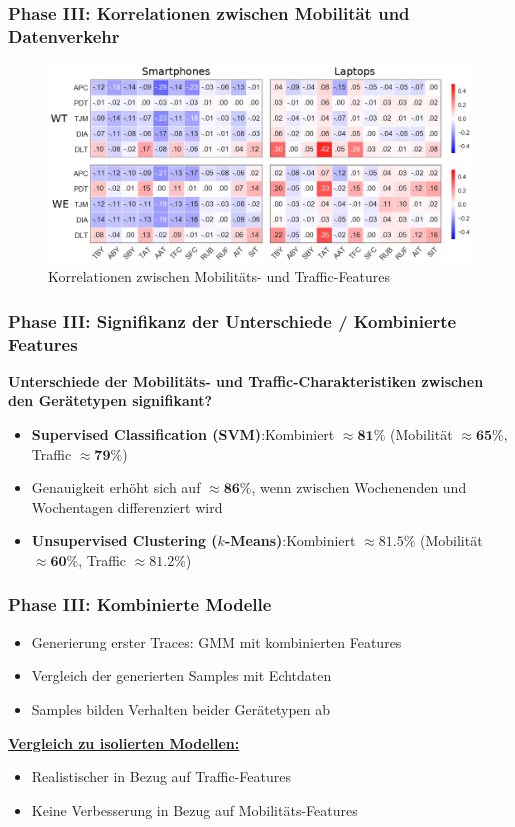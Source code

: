 \documentclass{beamer}
\begin{document}
\begin{frame}
  \frametitle{Phase III: Korrelationen zwischen Mobilität und Datenverkehr}
  \begin{figure}
    \centering
    \includegraphics[width=\textwidth]{images/correlations.png}
    \caption*{Korrelationen zwischen Mobilitäts- und Traffic-Features}
  \end{figure}
\end{frame}

\begin{frame}
  \frametitle{Phase III: Signifikanz der Unterschiede / Kombinierte Features}
  \textbf{Unterschiede der Mobilitäts- und Traffic-Charakteristiken zwischen den Gerätetypen signifikant?}\newline
  \begin{itemize}
    \item \textbf{Supervised Classification (SVM)}:\newline Kombiniert $\approx \boldsymbol{81\%}$ (Mobilität $\approx \boldsymbol{65 \%}$, Traffic $\approx \boldsymbol{79 \%}$)
    \item Genauigkeit erhöht sich auf $\approx \boldsymbol{86\%}$, wenn zwischen Wochenenden und Wochentagen differenziert wird\newline
    \item \textbf{Unsupervised Clustering ($k$-Means)}:\newline Kombiniert $\approx\boldsymbol{81.5 \%}$ (Mobilität $\approx \boldsymbol{60 \%}$, Traffic $\approx \boldsymbol{81.2 \%}$)
  \end{itemize}
\end{frame}

\begin{frame}
  \frametitle{Phase III: Kombinierte Modelle}
  \begin{itemize}
    \item Generierung erster Traces: \textsc{GMM} mit kombinierten Features
    \item Vergleich der generierten Samples mit Echtdaten
    \item Samples bilden Verhalten beider Gerätetypen ab
  \end{itemize}
  \vspace{15px}
  \textbf{\underline{Vergleich zu isolierten Modellen:}}
  \begin{itemize}
    \item Realistischer in Bezug auf Traffic-Features
    \item Keine Verbesserung in Bezug auf Mobilitäts-Features
  \end{itemize}
\end{frame}
\end{document}
